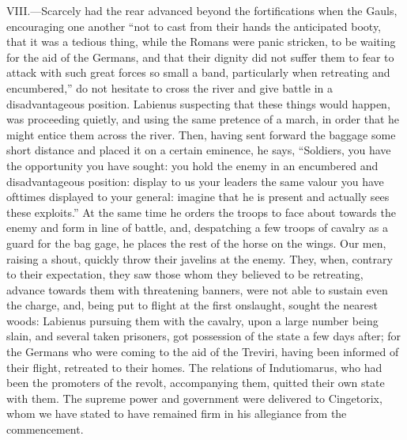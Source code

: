 VIII.—Scarcely had the rear advanced beyond the fortifications when the
Gauls, encouraging one another ``not to cast from their hands the
anticipated booty, that it was a tedious thing, while the Romans were
panic stricken, to be waiting for the aid of the Germans, and that their
dignity did not suffer them to fear to attack with such great forces so
small a band, particularly when retreating and encumbered,'' do not
hesitate to cross the river and give battle in a disadvantageous
position. Labienus suspecting that these things would happen, was
proceeding quietly, and using the same pretence of a march, in order
that he might entice them across the river. Then, having sent forward
the baggage some short distance and placed it on a certain eminence, he
says, ``Soldiers, you have the opportunity you have sought: you hold the
enemy in an encumbered and disadvantageous position: display to us your
leaders the same valour you have ofttimes displayed to your general:
imagine that he is present and actually sees these exploits.'' At the
same time he orders the troops to face about towards the enemy and form
in line of battle, and, despatching a few troops of cavalry as a guard
for the bag gage, he places the rest of the horse on the wings. Our men,
raising a shout, quickly throw their javelins at the enemy. They, when,
contrary to their expectation, they saw those whom they believed to be
retreating, advance towards them with threatening banners, were not able
to sustain even the charge, and, being put to flight at the first
onslaught, sought the nearest woods: Labienus pursuing them with the
cavalry, upon a large number being slain, and several taken prisoners,
got possession of the state a few days after; for the Germans who were
coming to the aid of the Treviri, having been informed of their flight,
retreated to their homes. The relations of Indutiomarus, who had been
the promoters of the revolt, accompanying them, quitted their own state
with them. The supreme power and government were delivered to
Cingetorix, whom we have stated to have remained firm in his allegiance
from the commencement.

